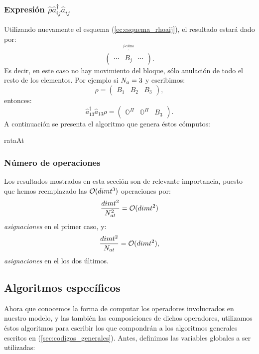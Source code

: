 \subsubsection*{Expresi\'on $\hat{\rho}\hat{a}_{ij}^{\dag}\hat{a}_{ij}$} Utilizando nuevamente el esquema (\ref{ec:esquema_rhoaij}), el resultado estar\'a dado por:
$$\overset{ \overbrace{}^{\mbox{$j$-\'esimo}}}{\left(\begin{array}{ccc}
\cdots&B_{j}&\cdots
        \end{array}\right)}.
$$
\quad Es decir, en este caso no hay movimiento del bloque, s\'olo anulaci\'on de todo el resto de los elementos. Por ejemplo si $N_a=3$ y escribimos:
$$\rho=\left(\begin{array}{ccc}              
B_{1}&B_2&B_3
             \end{array}\right),
$$
entonces:
$$\hat{a}^{\dag}_{13}\hat{a}_{13}\rho=\left(\begin{array}{ccc}              
\mathbb{O}^\Pi&\mathbb{O}^\Pi&B_{3}
             \end{array}\right).
$$
\quad A continuaci\'on se presenta el algoritmo que genera \'estos c\'omputos:

\begin{algorithm}[H]
\caption{rataAt}\label{algo:rataAt}
\LinesNumbered
{}
\end{algorithm}
\subsubsection*{N\'umero de operaciones} Los resultados mostrados en esta secci\'on son de relevante importancia, puesto que hemos reemplazado las $\mathcal{O}(dimt^3)$ operaciones por: 
$$\frac{dimt^2}{N_{at}^2}=\mathcal{O}(dimt^2)$$
\emph{asignaciones} en el primer caso, y:
$$\frac{dimt^2}{N_{at}}=\mathcal{O}(dimt^2),$$
\emph{asignaciones} en el los dos \'ultimos.

\subsection{Algoritmos espec\'ificos}
\quad Ahora que conocemos la forma de computar los operadores involucrados en nuestro modelo, y las tambi\'en las composiciones de dichos operadores, utilizamos \'estos algoritmos para escribir los que compondr\'an a los algoritmos generales escritos en (\ref{sec:codigos_generales}). Antes, definimos las variables globales a ser utilizadas:

